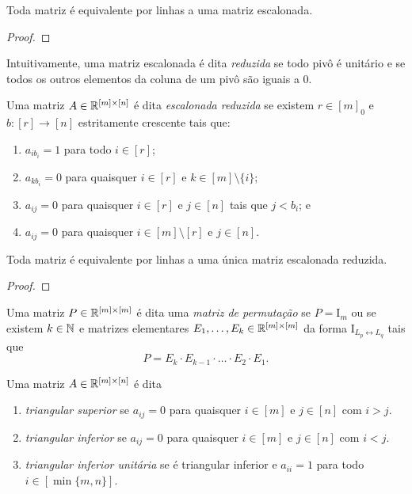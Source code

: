 \begin{theorem}
    Toda matriz é equivalente por linhas a uma matriz escalonada.
\end{theorem}

\begin{proof}
    \blackproof
\end{proof}

Intuitivamente, uma matriz escalonada é dita \emph{reduzida} se todo pivô é unitário e se todos os outros elementos da coluna de um pivô são iguais a 0.

\begin{definition}
    Uma matriz $A \in \mathbb{R}^{[m] \times [n]}$ é dita \emph{escalonada reduzida} se existem $r \in [m]_0 $ e $b : [r] \to [n]$ estritamente crescente tais que:
        \begin{enumerate}[label=\roman*.]
            \item $a_{ib_i} = 1$ para todo $i \in [r]$;
            \item $a_{k b_i} = 0$ para quaisquer $i \in [r]$ e $k \in [m] \setminus \{i\}$;
            \item $a_{ij} = 0$ para quaisquer $i \in [r]$ e $j \in [n]$ tais que $j < b_i$; e
            \item $a_{ij} = 0$ para quaisquer $i \in [m] \setminus [r]$ e $j \in [n]$.
        \end{enumerate}
\end{definition}

\begin{theorem}
    Toda matriz é equivalente por linhas a uma única matriz escalonada reduzida.
\end{theorem}

\begin{proof}
    \blackproof
\end{proof}

\begin{definition}
    Uma matriz $P \in \mathbb{R}^{[m] \times [m]}$ é dita uma \emph{matriz de permutação} se $P = \mathrm{I}_m$ ou se existem $k \in \mathbb{N}$ e matrizes elementares $E_1, \ldots, E_k \in \mathbb{R}^{[m] \times [m]}$ da forma $\mathrm{I}_{L_p \leftrightarrow L_q}$ tais que
        \[
            P = E_k \cdot E_{k-1} \cdot \ldots \cdot E_2 \cdot E_1.
        \]
\end{definition}

\begin{definition}
    Uma matriz $A \in \mathbb{R}^{[m] \times [n]}$ é dita
        \begin{enumerate}[label=\roman*.]
            \item \emph{triangular superior} se $a_{ij} = 0$ para quaisquer $i \in [m]$ e $j \in [n]$ com $i > j$.
            \item \emph{triangular inferior} se $a_{ij} = 0$ para quaisquer $i \in [m]$ e $j \in [n]$ com $i < j$.
            \item \emph{triangular inferior unitária} se é triangular inferior e $a_{ii} = 1$ para todo $i \in [\min\{m, n\}]$.
        \end{enumerate}
\end{definition}

